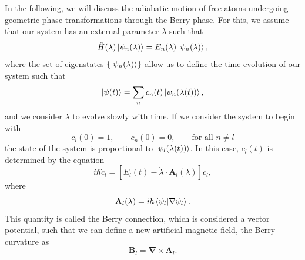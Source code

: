 In the following, we will discuss the adiabatic motion of free atoms undergoing geometric phase transformations through the Berry phase. 
For this, we assume that our system has an external parameter $\lambda$ such that
\begin{equation}
\hat H(\lambda) \ket{\psi_n(\lambda)} = E_n(\lambda)\ket{\psi_n(\lambda)},
\end{equation}
where the set of eigenstates $\left\{ \ket{\psi_n(\lambda)} \right\}$ allow us to define the time evolution of our system such that
\begin{equation}
\ket{\psi(t)} = \sum_n c_n(t) \ket{\psi_n(\lambda(t))},
\end{equation}
and we consider $\lambda$ to evolve slowly with time. If we consider the system to begin with
\begin{equation}
c_l(0) = 1,
\qquad
c_n(0) = 0, 
\qquad
\text{for all } n\neq l
\end{equation}
the state of the system is proportional to $\ket{\psi_l(\lambda(t))}$.
In this case, $c_l(t)$ is determined by the equation
\begin{equation}
i \hbar \dot{c}_l =  [E_l(t) - \dot{\lambda} \cdot \mathbf{A}_l(\lambda)]c_l,
\label{Bcnx-1}
\end{equation}
where 
\begin{equation}
\mathbf{A}_l(\lambda) = i \hbar \braket{\psi_l|\nabla\psi_l}.
\label{eqn:Bcnx}
\end{equation}
This quantity is called the Berry connection, which is considered a vector potential, such that we can define a new artificial magnetic field, the Berry curvature as
\begin{equation}
\mathbf{B}_l = \mathbf{\nabla} \times \mathbf{A}_l.
\label{eqn:BC}
\end{equation}

